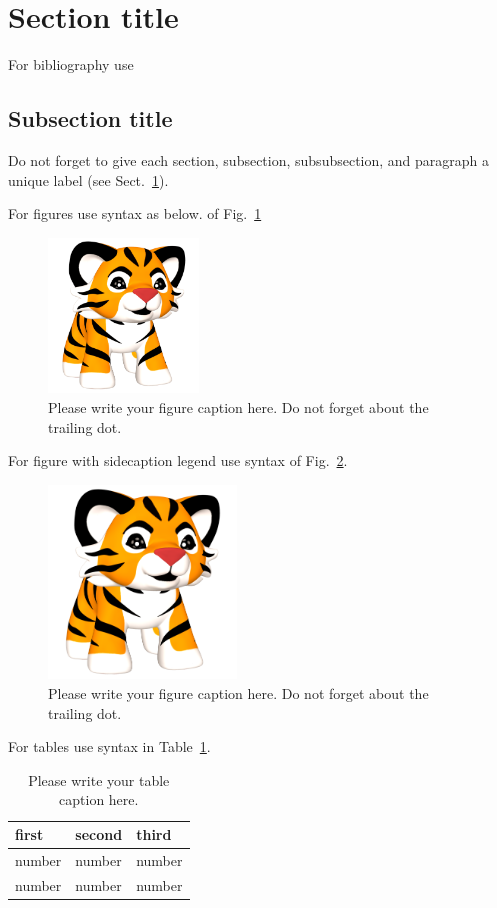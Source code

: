 \documentclass[epj]{webofc}
\begin{document}
\section{Section title}
\label{sec-1}
For bibliography use \cite{RefJ}
\subsection{Subsection title}
\label{sec-2}
Do not forget to give each section, subsection, subsubsection, and
paragraph a unique label (see Sect.~\ref{sec-1}).

For figures use syntax as below. of Fig.~\ref{fig-1}
\begin{figure}[ht]
\centering
\includegraphics[width=4cm,clip]{MesonProcPackage/tiger}
\caption{Please write your figure caption here. Do not forget about the trailing dot.}
\label{fig-1}       %
\end{figure}

For figure with sidecaption legend use syntax of Fig.~\ref{fig-3}.
\begin{figure}[ht]
\centering
\sidecaption
\includegraphics[width=5cm,clip]{MesonProcPackage/tiger}
\caption{Please write your figure caption here. Do not forget about the trailing dot.}
\label{fig-3}       %
\end{figure}

For tables use syntax in Table~\ref{tab-1}.
\begin{table}
\centering
\caption{Please write your table caption here.}
\label{tab-1}       %
\begin{tabular}{lll}
\hline
first & second & third  \\\hline
number & number & number \\
number & number & number \\\hline
\end{tabular}
\vspace*{5cm}  %
\end{table}
\end{document}
